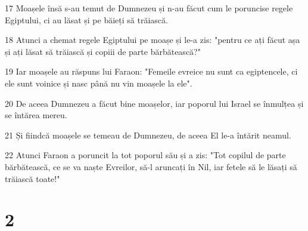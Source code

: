 \par 17 Moașele însă s-au temut de Dumnezeu și n-au făcut cum le poruncise regele Egiptului, ci au lăsat și pe băieți să trăiască.
\par 18 Atunci a chemat regele Egiptului pe moașe și le-a zis: "pentru ce ați făcut așa și ați lăsat să trăiască și copiii de parte bărbătească?"
\par 19 Iar moașele au răspuns lui Faraon: "Femeile evreice nu sunt ca egiptencele, ci ele sunt voinice și nasc până nu vin moașele la ele".
\par 20 De aceea Dumnezeu a făcut bine moașelor, iar poporul lui Israel se înmulțea și se întărea mereu.
\par 21 Și fiindcă moașele se temeau de Dumnezeu, de aceea El le-a întărit neamul.
\par 22 Atunci Faraon a poruncit la tot poporul său și a zis: "Tot copilul de parte bărbătească, ce se va naște Evreilor, să-l aruncați în Nil, iar fetele să le lăsați să trăiască toate!"

\chapter{2}

